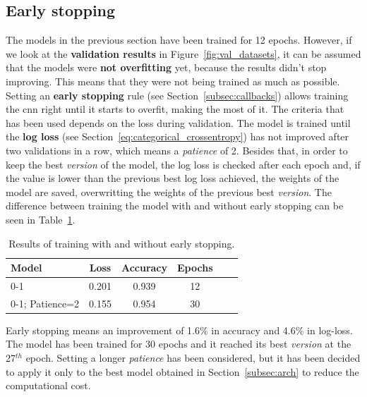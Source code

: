 \subsection{Early stopping}\label{subsec:early_stopping}
The models in the previous section have been trained for 12 epochs. However, if we look at the \textbf{validation results} in Figure~\ref{fig:val_datasets}, it can be assumed that the models were \textbf{not overfitting} yet, because the results didn't stop improving. This means that they were not being trained as much as possible. Setting an \textbf{early stopping} rule (see Section~\ref{subsec:callbacks}) allows training the \gls{cnn} right until it starts to overfit, making the most of it. The criteria that has been used depends on the loss during validation. The model is trained until the \textbf{log loss} (see Section~\ref{eq:categorical_crossentropy}) has not improved after two validations in a row, which means a \textit{patience} of 2. Besides that, in order to keep the best \textit{version} of the model, the log loss is checked after each epoch and, if the value is lower than the previous best log loss achieved, the weights of the model are saved, overwritting the weights of the previous best \textit{version}. The difference between training the model with and without early stopping can be seen in Table~\ref{tbl:earlystopping}.
\begin{table}
	\centering
	\begin{tabular}{l*{4}{c}r}
		\textbf{Model} & \textbf{Loss} & \textbf{Accuracy} & \textbf{Epochs} \\
		\hline
		0-1 & 0.201 & 0.939 & 12 \\
		0-1; Patience=2 & 0.155 & 0.954 & 30 \\
	\end{tabular}
	\caption{Results of training with and without early stopping.}
	\label{tbl:earlystopping}
\end{table}

Early stopping means an improvement of 1.6\% in accuracy and 4.6\% in log-loss. The model has been trained for 30 epochs and it reached its best \textit{version} at the 27$^{th}$ epoch. Setting a longer \textit{patience} has been considered, but it has been decided to apply it only to the best model obtained in Section~\ref{subsec:arch} to reduce the computational cost.

